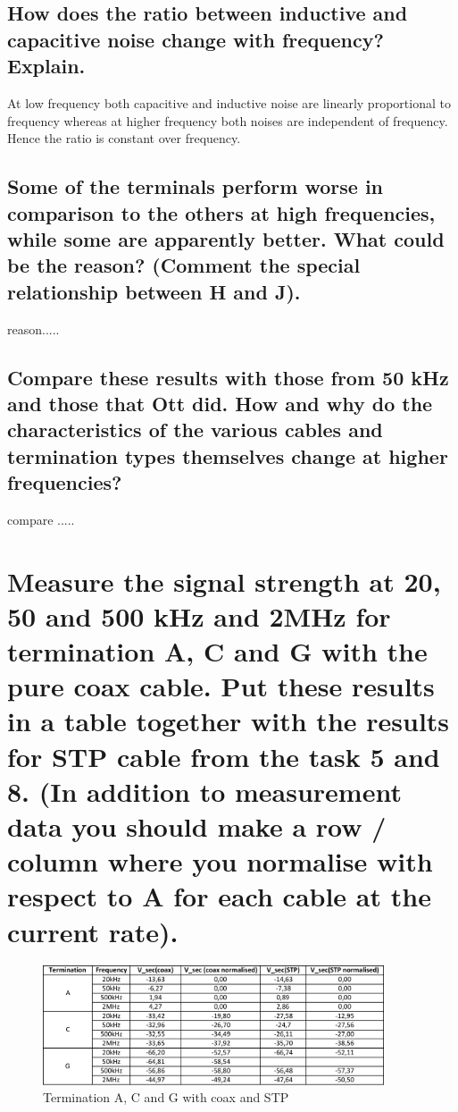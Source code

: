 \documentclass[12pt,a4paper,UKenglish]{article}
\begin{document}
\subsection{How does the ratio between inductive and capacitive noise change with frequency? Explain.}
At low frequency both capacitive and inductive noise are linearly proportional to frequency whereas at higher frequency both noises are independent of frequency. Hence the ratio is constant over frequency.

\subsection{Some of the terminals perform worse in comparison to the others at high frequencies, while some are apparently better. What could be the reason? (Comment the special relationship between H and J).}
reason.....

\subsection{Compare these results with those from 50 kHz and those that Ott did. How and why do the characteristics of the various cables and termination types themselves change at higher frequencies?}
compare .....

\section{Measure the signal strength at 20, 50 and 500 kHz and 2MHz for termination A, C and G with the pure coax cable. Put these results in a table together with the results for STP cable from the task 5 and 8. (In addition to measurement data you should make a row / column where you normalise with respect to A for each cable at the current rate).}
\begin{figure} [H] %
  \centering 
  \includegraphics[width=0.9\textwidth]{img/task9_data.pdf} 
  \caption{Termination A, C and G with coax and STP}
  \label{fig:task9} 
\end{figure}
\end{document}

